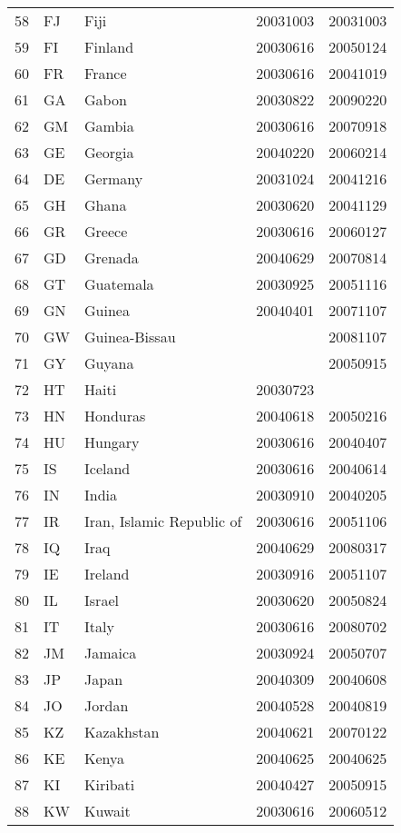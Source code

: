 \begin{longtable}{rllrr}
  58 & FJ & Fiji & 20031003 & 20031003 \\ 
  59 & FI & Finland & 20030616 & 20050124 \\ 
  60 & FR & France & 20030616 & 20041019 \\ 
  61 & GA & Gabon & 20030822 & 20090220 \\ 
  62 & GM & Gambia & 20030616 & 20070918 \\ 
  63 & GE & Georgia & 20040220 & 20060214 \\ 
  64 & DE & Germany & 20031024 & 20041216 \\ 
  65 & GH & Ghana & 20030620 & 20041129 \\ 
  66 & GR & Greece & 20030616 & 20060127 \\ 
  67 & GD & Grenada & 20040629 & 20070814 \\ 
  68 & GT & Guatemala & 20030925 & 20051116 \\ 
  69 & GN & Guinea & 20040401 & 20071107 \\ 
  70 & GW & Guinea-Bissau &  & 20081107 \\ 
  71 & GY & Guyana &  & 20050915 \\ 
  72 & HT & Haiti & 20030723 &  \\ 
  73 & HN & Honduras & 20040618 & 20050216 \\ 
  74 & HU & Hungary & 20030616 & 20040407 \\ 
  75 & IS & Iceland & 20030616 & 20040614 \\ 
  76 & IN & India & 20030910 & 20040205 \\ 
  77 & IR & Iran, Islamic Republic of & 20030616 & 20051106 \\ 
  78 & IQ & Iraq & 20040629 & 20080317 \\ 
  79 & IE & Ireland & 20030916 & 20051107 \\ 
  80 & IL & Israel & 20030620 & 20050824 \\ 
  81 & IT & Italy & 20030616 & 20080702 \\ 
  82 & JM & Jamaica & 20030924 & 20050707 \\ 
  83 & JP & Japan & 20040309 & 20040608 \\ 
  84 & JO & Jordan & 20040528 & 20040819 \\ 
  85 & KZ & Kazakhstan & 20040621 & 20070122 \\ 
  86 & KE & Kenya & 20040625 & 20040625 \\ 
  87 & KI & Kiribati & 20040427 & 20050915 \\ 
  88 & KW & Kuwait & 20030616 & 20060512 \\ 

\end{longtable}
